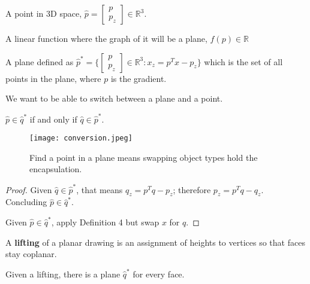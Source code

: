 \documentclass{article}
\begin{document}
    \begin{definition}
        A point in 3D space, $\hat{p}=
        \begin{bmatrix}
        p \\
        p_z
        \end{bmatrix} \in \mathbb{R}^3$.
    \end{definition}
    
    \begin{definition}
        A linear function where the graph of it will be a plane, $f(p) \in \mathbb{R}$
    \end{definition}
    
    \begin{definition}
        A plane defined as $\hat{p}^* = \{ \begin{bmatrix}
        p \\
        p_z
        \end{bmatrix} \in \mathbb{R}^3: x_z=p^Tx-p_z \}$ which is the set of all points in the plane, where $p$ is the gradient.
    \end{definition}
    
    We want to be able to switch between a plane and a point.
    
    \begin{corollary}[]
        $\hat{p} \in \hat{q}^*$ if and only if $\hat{q} \in \hat{p}^*$.
    \end{corollary}
    
    \begin{figure}[H]
        \centering
        \texttt{[image: conversion.jpeg]}
        \caption{Find a point in a plane means swapping object types hold the encapsulation.}
    \end{figure}
    
    \begin{proof}
        Given $\hat{q} \in \hat{p}^*$, that means $q_z=p^Tq-p_z$; therefore $p_z=p^Tq-q_z$. Concluding $\hat{p} \in \hat{q}^*$.
        
        Given $\hat{p} \in \hat{q}^*$, apply Definition 4 but swap $x$ for $q$.
    \end{proof}
    
    \begin{definition}[lifting]
        A \textbf{lifting} of a planar drawing is an assignment of heights to vertices so that faces stay coplanar.
    \end{definition}
    
    \begin{remark}
        Given a lifting, there is a plane $\hat{q}^*$ for every face.
    \end{remark}
    
\end{document}
